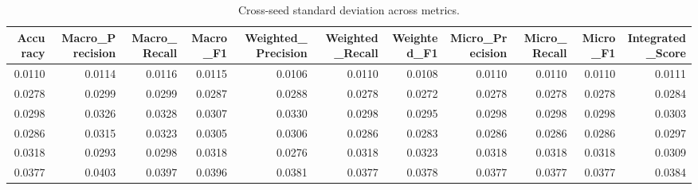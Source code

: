 \begin{table}[t]
\centering
\begin{tabular}{rrrrrrrrrrr}
\toprule
Accuracy & Macro_Precision & Macro_Recall & Macro_F1 & Weighted_Precision & Weighted_Recall & Weighted_F1 & Micro_Precision & Micro_Recall & Micro_F1 & Integrated_Score \\
\midrule
0.0110 & 0.0114 & 0.0116 & 0.0115 & 0.0106 & 0.0110 & 0.0108 & 0.0110 & 0.0110 & 0.0110 & 0.0111 \\
0.0278 & 0.0299 & 0.0299 & 0.0287 & 0.0288 & 0.0278 & 0.0272 & 0.0278 & 0.0278 & 0.0278 & 0.0284 \\
0.0298 & 0.0326 & 0.0328 & 0.0307 & 0.0330 & 0.0298 & 0.0295 & 0.0298 & 0.0298 & 0.0298 & 0.0303 \\
0.0286 & 0.0315 & 0.0323 & 0.0305 & 0.0306 & 0.0286 & 0.0283 & 0.0286 & 0.0286 & 0.0286 & 0.0297 \\
0.0318 & 0.0293 & 0.0298 & 0.0318 & 0.0276 & 0.0318 & 0.0323 & 0.0318 & 0.0318 & 0.0318 & 0.0309 \\
0.0377 & 0.0403 & 0.0397 & 0.0396 & 0.0381 & 0.0377 & 0.0378 & 0.0377 & 0.0377 & 0.0377 & 0.0384 \\
\bottomrule
\end{tabular}
\caption{Cross-seed standard deviation across metrics.}
\label{tab:cross_seed_std}
\end{table}